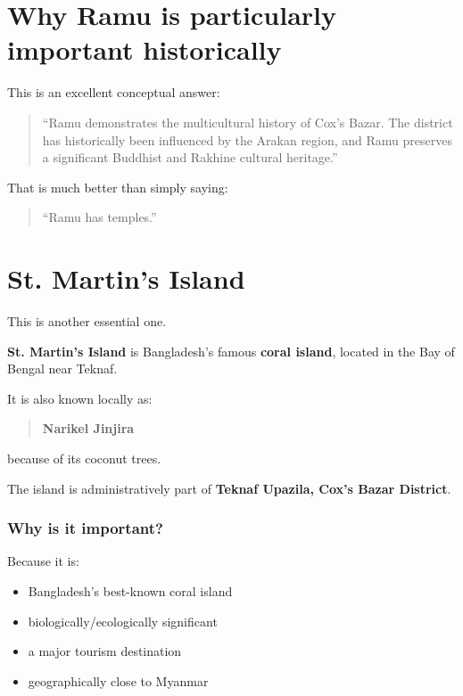 \medskip

\section{Why Ramu is particularly important historically}

This is an excellent conceptual answer:

\begin{quote}
``Ramu demonstrates the multicultural history of Cox's Bazar. The district has historically been influenced by the Arakan region, and Ramu preserves a significant Buddhist and Rakhine cultural heritage.''\\
\end{quote}

That is much better than simply saying:

\begin{quote}
``Ramu has temples.''\\
\end{quote}

\medskip

\section{St. Martin's Island}

This is another essential one.

\textbf{St. Martin's Island} is Bangladesh's famous \textbf{coral island}, located in the Bay of Bengal near Teknaf.

It is also known locally as:

\begin{quote}
\textbf{Narikel Jinjira}\\
\end{quote}

because of its coconut trees.

The island is administratively part of \textbf{Teknaf Upazila, Cox's Bazar District}.

\subsubsection{Why is it important?}

Because it is:

\begin{itemize}
  \item Bangladesh's best-known coral island
  \item biologically/ecologically significant
  \item a major tourism destination
  \item geographically close to Myanmar
\end{itemize}


